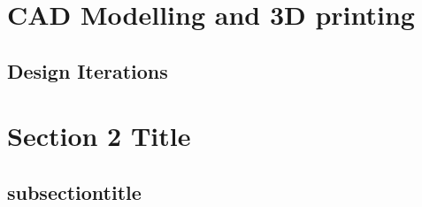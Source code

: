 \section{CAD Modelling and 3D printing}
\subsection{Design Iterations}


\section{Section 2 Title}
\subsection{subsectiontitle}
